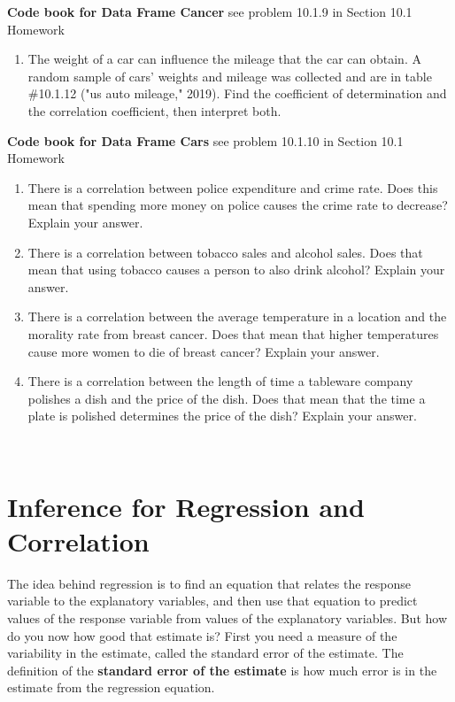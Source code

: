 \documentclass[
]{book}
\providecommand{\tightlist}{%
  \setlength{\itemsep}{0pt}\setlength{\parskip}{0pt}}
\begin{document}
\textbf{Code book for Data Frame Cancer} see problem 10.1.9 in Section 10.1 Homework

\begin{enumerate}
\def\labelenumi{\arabic{enumi}.}
\setcounter{enumi}{9}
\tightlist
\item
  The weight of a car can influence the mileage that the car can obtain. A random sample of cars' weights and mileage was collected and are in table \#10.1.12 ("us auto mileage," 2019). Find the coefficient of determination and the correlation coefficient, then interpret both.
\end{enumerate}

\textbf{Code book for Data Frame Cars} see problem 10.1.10 in Section 10.1 Homework

\begin{enumerate}
\def\labelenumi{\arabic{enumi}.}
\setcounter{enumi}{10}
\item
  There is a correlation between police expenditure and crime rate. Does this mean that spending more money on police causes the crime rate to decrease? Explain your answer.
\item
  There is a correlation between tobacco sales and alcohol sales. Does that mean that using tobacco causes a person to also drink alcohol? Explain your answer.
\item
  There is a correlation between the average temperature in a location and the morality rate from breast cancer. Does that mean that higher temperatures cause more women to die of breast cancer? Explain your answer.
\item
  There is a correlation between the length of time a tableware company polishes a dish and the price of the dish. Does that mean that the time a plate is polished determines the price of the dish? Explain your answer.
\end{enumerate}

\textbf{\\
}

\hypertarget{inference-for-regression-and-correlation}{%
\section{Inference for Regression and Correlation}\label{inference-for-regression-and-correlation}}

The idea behind regression is to find an equation that relates the response variable to the explanatory variables, and then use that equation to predict values of the response variable from values of the explanatory variables. But how do you now how good that estimate is? First you need a measure of the variability in the estimate, called the standard error of the estimate. The definition of the \textbf{standard error of the estimate} is how much error is in the estimate from the regression equation.
\end{document}
